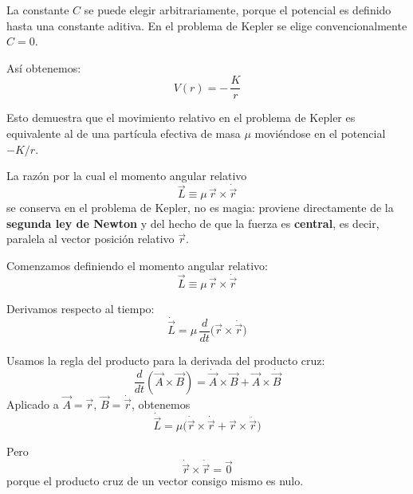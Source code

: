 \documentclass{article}
\begin{document}
La constante \(C\) se puede elegir arbitrariamente, porque el potencial es definido
hasta una constante aditiva.  
En el problema de Kepler se elige convencionalmente \(C=0\).

Así obtenemos:
\begin{equation}
\boxed{
V(r) = -\,\frac{K}{r}
}
\label{eq:potencial_kepler}
\end{equation}

Esto demuestra que el movimiento relativo en el problema de Kepler es equivalente
al de una partícula efectiva de masa \(\mu\) moviéndose en el potencial
\(-K/r\).




La razón por la cual el momento angular relativo
\[
\vec L \equiv \mu\,\vec r \times \dot{\vec r}
\]
se conserva en el problema de Kepler, no es magia: proviene directamente de la
\textbf{segunda ley de Newton} y del hecho de que la fuerza es \textbf{central}, es decir,
paralela al vector posición relativo \(\vec r\).

Comenzamos definiendo el momento angular relativo:
\begin{equation}
\vec L \equiv \mu\,\vec r \times \dot{\vec r}
\label{eq:def_L_demo}
\end{equation}

Derivamos respecto al tiempo:
\begin{equation}
\dot{\vec L}
= \mu\,\frac{d}{dt}\big( \vec r \times \dot{\vec r} \big)
\label{eq:Ldot_inicio}
\end{equation}

Usamos la regla del producto para la derivada del producto cruz:
\[
\frac{d}{dt}(\vec A \times \vec B)
= \dot{\vec A}\times \vec B + \vec A \times \dot{\vec B}
\]
Aplicado a \(\vec A=\vec r\), \(\vec B=\dot{\vec r}\), obtenemos
\begin{equation}
\dot{\vec L}
= \mu\big( \dot{\vec r}\times \dot{\vec r} + \vec r \times \ddot{\vec r} \big)
\label{eq:producto_cruz}
\end{equation}

Pero
\[
\dot{\vec r}\times \dot{\vec r} = \vec 0
\]
porque el producto cruz de un vector consigo mismo es nulo.
\end{document}
